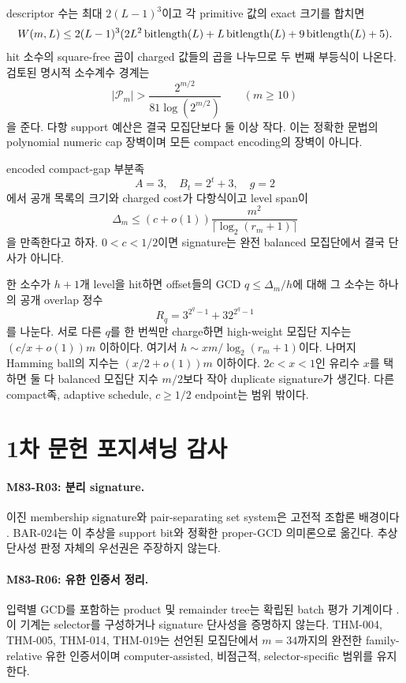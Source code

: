 \documentclass[11pt]{article}
\begin{document}
\begin{claimproof}
descriptor 수는 최대 \(2(L-1)^3\)이고 각 primitive 값의 exact 크기를
합치면
\[
W(m,L)\le
2(L-1)^3(2L^2\operatorname{bitlength}(L)+L\operatorname{bitlength}(L)+9\operatorname{bitlength}(L)+5).
\]
hit 소수의 square-free 곱이 charged 값들의 곱을 나누므로 두 번째
부등식이 나온다. 검토된 명시적 소수계수 경계는
\[
|\mathcal P_m|>
\frac{2^{m/2}}{81\log(2^{m/2})}\qquad(m\ge10)
\]
을 준다. 다항 support 예산은 결국 모집단보다 둘 이상 작다. 이는
정확한 문법의 polynomial numeric cap 장벽이며 모든 compact encoding의
장벽이 아니다.
\end{claimproof}

{}
encoded compact-gap 부분족
\[
A=3,\quad B_t=2^t+3,\quad g=2
\]
에서 공개 목록의 크기와 charged cost가 다항식이고 level span이
\[
\Delta_m\le(c+o(1))
\frac{m^2}{\lceil\log_2(r_m+1)\rceil}
\]
을 만족한다고 하자. \(0<c<1/2\)이면 signature는 완전 balanced
모집단에서 결국 단사가 아니다.

\begin{claimproof}
한 소수가 \(h+1\)개 level을 hit하면 offset들의 GCD
\(q\le\Delta_m/h\)에 대해 그 소수는 하나의 공개 overlap 정수
\[
R_q=3^{2^q-1}+32^{2^q-1}
\]
를 나눈다. 서로 다른 \(q\)를 한 번씩만 charge하면 high-weight
모집단 지수는 \((c/x+o(1))m\) 이하이다. 여기서
\(h\sim xm/\log_2(r_m+1)\)이다. 나머지 Hamming ball의 지수는
\((x/2+o(1))m\) 이하이다. \(2c<x<1\)인 유리수 \(x\)를 택하면 둘 다
balanced 모집단 지수 \(m/2\)보다 작아 duplicate signature가 생긴다.
다른 compact족, adaptive schedule, \(c\ge1/2\) endpoint는 범위 밖이다.
\end{claimproof}

\appendix

\section{1차 문헌 포지셔닝 감사}
\label{app:finite-source-positioning}

\paragraph{M83-R03: 분리 signature.}
이진 membership signature와 pair-separating set system은 고전적
조합론 배경이다 \cite{katona1966separating}. BAR-024는 이 추상을
support bit와 정확한 proper-GCD 의미론으로 옮긴다. 추상 단사성
판정 자체의 우선권은 주장하지 않는다.

\paragraph{M83-R06: 유한 인증서 정리.}
입력별 GCD를 포함하는 product 및 remainder tree는 확립된 batch
평가 기계이다 \cite{bernstein2004smoothparts}. 이 기계는 selector를
구성하거나 signature 단사성을 증명하지 않는다. THM-004, THM-005,
THM-014, THM-019는 선언된 모집단에서 \(m=34\)까지의 완전한
family-relative 유한 인증서이며 computer-assisted, 비점근적,
selector-specific 범위를 유지한다.
\end{document}
